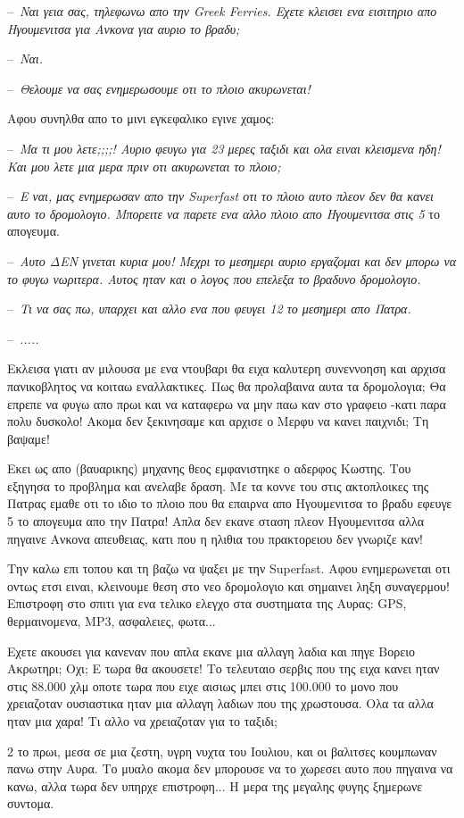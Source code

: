 \documentclass[11pt, letterpaper]{book}
\newcommand\dialogue[1]{\par\noindent--~\textit{#1}}
\begin{document}
\dialogue{Ναι γεια σας, τηλεφωνω απο την Greek Ferries. Eχετε κλεισει ενα εισιτηριο απο Ηγουμενιτσα για Ανκονα για αυριο το βραδυ;}
\dialogue{Ναι.}
\dialogue{Θελουμε να σας ενημερωσουμε οτι το πλοιο ακυρωνεται!}

Αφου συνηλθα απο το μινι εγκεφαλικο εγινε χαμος:

\dialogue{Μα τι μου λετε;;;;! Αυριο φευγω για 23 μερες ταξιδι και ολα ειναι κλεισμενα ηδη! Και μου λετε μια μερα πριν οτι ακυρωνεται το πλοιο;}
\dialogue{Ε ναι, μας ενημερωσαν απο την Superfast οτι το πλοιο αυτο πλεον δεν θα κανει αυτο το δρομολογιο. Μπορειτε να παρετε ενα αλλο πλοιο απο Ηγουμενιτσα στις 5 }το απογευμα.
\dialogue{Αυτο ΔΕΝ γινεται κυρια μου! Μεχρι το μεσημερι αυριο εργαζομαι και δεν μπορω να το φυγω νωριτερα. Αυτος ηταν και ο λογος που επελεξα το βραδυνο δρομολογιο.}
\dialogue{Τι να σας πω, υπαρχει και αλλο ενα που φευγει 12 το μεσημερι απο Πατρα.}
\dialogue{.....}

Εκλεισα γιατι αν μιλουσα με ενα ντουβαρι θα ειχα καλυτερη συνεννοηση και αρχισα πανικοβλητος να κοιταω εναλλακτικες. Πως θα προλαβαινα αυτα τα δρομολογια; Θα επρεπε να φυγω απο πρωι και να καταφερω να μην παω καν στο γραφειο -κατι παρα πολυ δυσκολο! Ακομα δεν ξεκινησαμε και αρχισε ο Μερφυ να κανει παιχνιδι; Τη βαψαμε!

Εκει ως απο (βαυαρικης) μηχανης θεος εμφανιστηκε ο αδερφος Κωστης. Του εξηγησα το προβλημα και ανελαβε δραση. Με τα κοννε του στις ακτοπλοικες της Πατρας εμαθε οτι το ιδιο το πλοιο που θα επαιρνα απο Ηγουμενιτσα το βραδυ εφευγε 5 το απογευμα απο την Πατρα! Απλα δεν εκανε σταση πλεον Ηγουμενιτσα αλλα πηγαινε Ανκονα απευθειας, κατι που η ηλιθια του πρακτορειου δεν γνωριζε καν!

Την καλω επι τοπου και τη βαζω να ψαξει με την Superfast. Αφου ενημερωνεται οτι οντως ετσι ειναι, κλεινουμε θεση στο νεο δρομολογιο και σημαινει ληξη συναγερμου! Επιστροφη στο σπιτι για ενα τελικο ελεγχο στα συστηματα της Αυρας: GPS, θερμαινομενα, MP3, ασφαλειες, φωτα...

Εχετε ακουσει για κανεναν που απλα εκανε μια αλλαγη λαδια και πηγε Βορειο Ακρωτηρι; Οχι; Ε τωρα θα ακουσετε! Το τελευταιο σερβις που της ειχα κανει ηταν στις 88.000 χλμ οποτε τωρα που ειχε αισιως μπει στις 100.000 το μονο που χρειαζοταν ουσιαστικα ηταν μια αλλαγη λαδιων που της χρωστουσα. Ολα τα αλλα ηταν μια χαρα! Τι αλλο να χρειαζοταν για το ταξιδι;

2 το πρωι, μεσα σε μια ζεστη, υγρη νυχτα του Ιουλιου, και οι βαλιτσες κουμπωναν πανω στην Αυρα.
Το μυαλο ακομα δεν μπορουσε να το χωρεσει αυτο που πηγαινα να κανω, αλλα τωρα δεν υπηρχε επιστροφη...
Η μερα της μεγαλης φυγης ξημερωνε συντομα.
\end{document}

